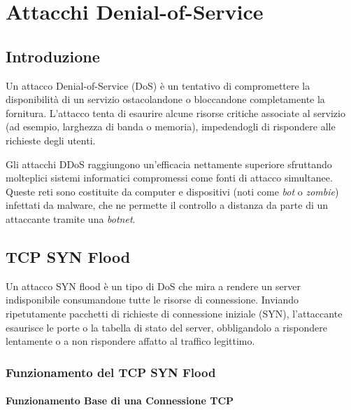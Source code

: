 \chapter{Attacchi Denial-of-Service}

\section{Introduzione}

\begin{defbox}
Un attacco Denial-of-Service (DoS) è un tentativo di compromettere la disponibilità di un servizio ostacolandone o bloccandone completamente la fornitura.
L'attacco tenta di esaurire alcune risorse critiche associate al servizio (ad esempio, larghezza di banda o memoria), impedendogli di rispondere alle richieste degli utenti.
\end{defbox}

\begin{warnbox}
Gli attacchi DDoS raggiungono un'efficacia nettamente superiore sfruttando molteplici sistemi informatici compromessi come fonti di attacco simultanee. Queste reti sono costituite da computer e dispositivi (noti come \textit{bot} o \textit{zombie}) infettati da malware, che ne permette il controllo a distanza da parte di un attaccante tramite una \textit{botnet}.
\end{warnbox}

\section{TCP SYN Flood}

Un attacco SYN flood è un tipo di DoS che mira a rendere un server indisponibile consumandone tutte le risorse di connessione. Inviando ripetutamente pacchetti di richieste di connessione iniziale (SYN), l'attaccante esaurisce le porte o la tabella di stato del server, obbligandolo a rispondere lentamente o a non rispondere affatto al traffico legittimo.

\subsection{Funzionamento del TCP SYN Flood}

\subsubsection{Funzionamento Base di una Connessione TCP}

